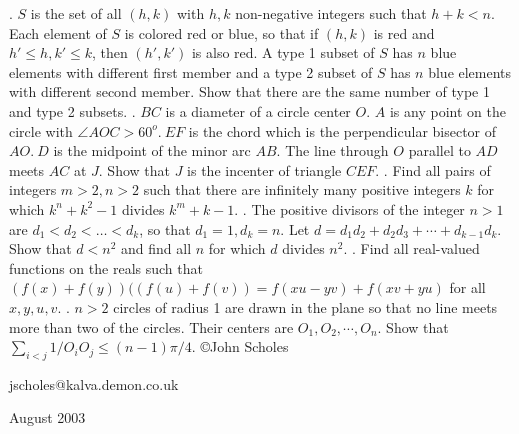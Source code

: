 \nopagenumbers
{}
\vskip 25pt
. $S$ is the set  of all $(h, k)$ with $h, k$ non-negative integers such that $h+k < n$. Each element of $S$ is colored red or blue, so that if  $(h, k)$ is red and $h' \le h, k' \le k$, then $(h', k')$ is also red. A type 1 subset of $S$ has $n$ blue elements with different first member and a type 2 subset of $S$ has $n$ blue elements with different second member. Show that there are the same number of type 1 and type 2 subsets. 
\vskip 12pt
. $BC$ is a diameter of a circle center $O$. $A$ is any point on the circle with $\angle AOC > 60^o. \ EF$ is the chord which is the perpendicular bisector of $AO. \ D$ is the midpoint of the minor arc $AB$. The line through $O$ parallel to $AD$ meets $AC$ at $J$. Show that $J$ is the incenter of triangle $CEF$.
\vskip 12pt
. Find all pairs of integers $m > 2, n > 2$ such that there are infinitely many positive integers $k$ for which $k^n + k^2 - 1$ divides $k^m + k-1$.
\vskip 12pt
. The positive divisors of the integer $n > 1$ are $d_1 < d_2 < \ldots < d_k$, so that $d_1 = 1, d_k = n$. Let $d = d_1 d_2 + d_2 d_3 + \cdots + d_{k-1}d_k$. Show that $d < n^2$ and find all $n$ for which $d$ divides $n^2$.
\vskip 12pt
. Find all real-valued functions on the reals such that $(f(x) + f(y)) ((f(u) + f(v)) = f(xu - yv) + f(xv + yu)$ for all $x, y, u, v$.
\vskip 12pt
. $n > 2$ circles of radius 1 are drawn in the plane so that no line meets more than two of the circles. Their centers are $O_1, O_2, \cdots , O_n$. Show that $\sum_{i<j} 1/O_iO_j \le (n-1)\pi /4$. 
\vskip 20pt
\noindent \copyright John Scholes

\noindent jscholes@kalva.demon.co.uk

 August 2003

\bye
